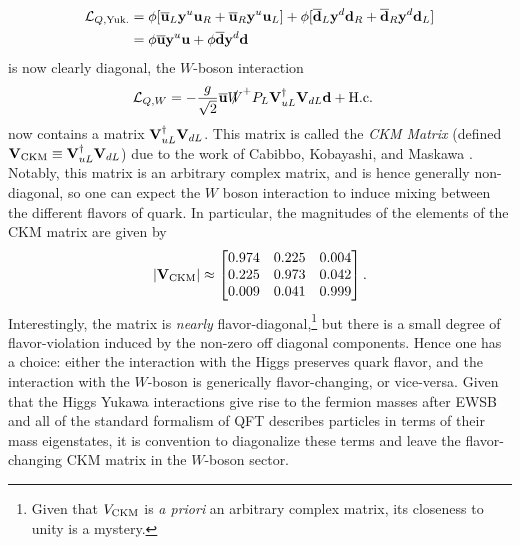 \begin{align}
    {\cal L}_{Q,{\rm Yuk.}} 
    &= \phi[\overline{\bf u}_L{\bf y}^u {\bf u}_R+\overline{\bf u}_R{\bf y}^{u} {\bf u}_L] + \phi[\overline{\bf d}_L{\bf y}^d {\bf d}_R+\overline{\bf d}_R{\bf y}^{d} {\bf d}_L]\nonumber\\
    &= \phi\overline{\bf u}{\bf y}^u {\bf u} + \phi\overline{\bf d}{\bf y}^d {\bf d}
\end{align}
is now clearly diagonal, the $W$-boson interaction
\begin{align}
    {\cal L}_{Q,W} &= -\frac{g}{\sqrt{2}} \overline{\bf u}\slashed{W}^+P_L{\bf V}_{uL}^\dagger {\bf V}_{dL}{\bf d} + {\rm H.c.}
\end{align}
now contains a matrix ${\bf V}_{uL}^\dagger {\bf V}_{dL}$. This matrix is called the {\it CKM Matrix} (defined ${\bf V}_{\rm CKM} \equiv {\bf V}_{uL}^\dagger {\bf V}_{dL}$) due to the work of Cabibbo, Kobayashi, and Maskawa \cite{Cabibbo:1963yz,Kobayashi:1973fv}. Notably, this matrix is an arbitrary complex matrix, and is hence generally non-diagonal, so one can expect the $W$ boson interaction to induce mixing between the different flavors of quark. In particular, the magnitudes of the elements of the CKM matrix are given by \cite{ParticleDataGroup:2024cfk}
\begin{align}
    |{\bf V}_{\rm CKM}| \approx \begin{bmatrix} 0.974 & 0.225 & 0.004 \\ 
                                                0.225 & 0.973 & 0.042 \\
                                                0.009 & 0.041 & 0.999
                                \end{bmatrix}.
\end{align}
Interestingly, the matrix is {\it nearly} flavor-diagonal,\footnote{Given that $V_{\rm CKM}$ is {\it a priori} an arbitrary complex matrix, its closeness to unity is a mystery.} but there is a small degree of flavor-violation induced by the non-zero off diagonal components. Hence one has a choice: either the interaction with the Higgs preserves quark flavor, and the interaction with the $W$-boson is generically flavor-changing, or vice-versa. Given that the Higgs Yukawa interactions give rise to the fermion masses after EWSB and all of the standard formalism of QFT describes particles in terms of their mass eigenstates, it is convention to diagonalize these terms and leave the flavor-changing CKM matrix in the $W$-boson sector.



